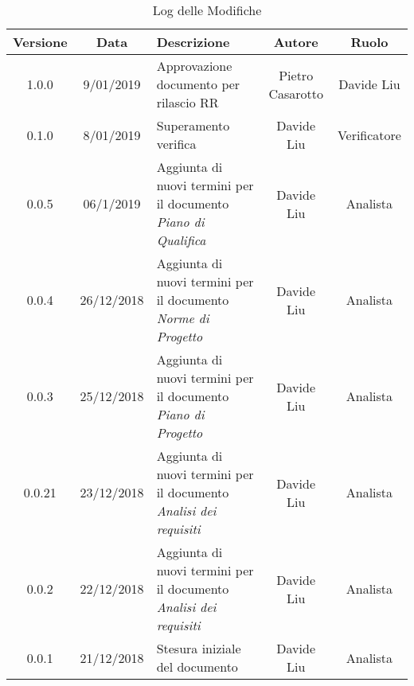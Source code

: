 \vspace*{25px}
\begin{table}[!htbp] %
            \centering
            \renewcommand{\arraystretch}{2}
            \begin{tabular}{|c|c|p{5cm}|c|c|} %
                \rowcolor{orange!50} %
        		\hline
        		\textbf{Versione} & \textbf{Data} & \textbf{Descrizione} & \textbf{Autore} & \textbf{Ruolo} \\
                \hline
                1.0.0 & 9/01/2019 & Approvazione documento per rilascio RR & Pietro Casarotto & Davide Liu \\
                \hline
                0.1.0 & 8/01/2019 & Superamento verifica & Davide Liu & Verificatore \\
                \hline
                0.0.5 & 06/1/2019 & Aggiunta di nuovi termini per il documento \textit{Piano di Qualifica} & Davide Liu & Analista \\
                \hline
                0.0.4 & 26/12/2018 & Aggiunta di nuovi termini per il documento \textit{Norme di Progetto} & Davide Liu & Analista \\
                \hline
                0.0.3 & 25/12/2018 & Aggiunta di nuovi termini per il documento \textit{Piano di Progetto} & Davide Liu & Analista \\
                \hline
                0.0.21 & 23/12/2018 & Aggiunta di nuovi termini per il documento \textit{Analisi dei requisiti} & Davide Liu & Analista \\
                \hline
                0.0.2 & 22/12/2018 & Aggiunta di nuovi termini per il documento \textit{Analisi dei requisiti} & Davide Liu & Analista \\
                \hline
                0.0.1 & 21/12/2018 & Stesura iniziale del documento & Davide Liu & Analista \\
                \hline
                
        \end{tabular}
        \caption{Log delle Modifiche} %
\end{table}
